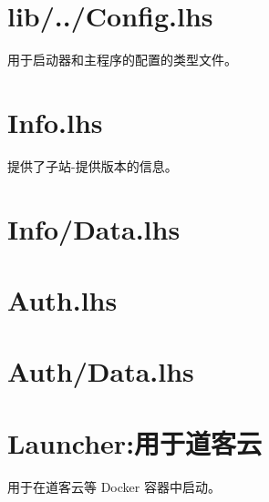   \section[共用的配置文件 lib/Yrarbil/Backend/Config.lhs]{lib/../Config.lhs}
  用于启动器和主程序的配置的类型文件。
  

  \section[子站-提供版本信息 Info.lhs文件]{Info.lhs}
  提供了子站-提供版本的信息。
  

  \section[辅助Info.lhs文件]{Info/Data.lhs}
  

  \section[认证]{Auth.lhs}
  

  \section[辅助Auth.lhs]{Auth/Data.lhs}
  

  \section{Launcher:用于道客云}
  用于在道客云等 Docker 容器中启动。
  
  
